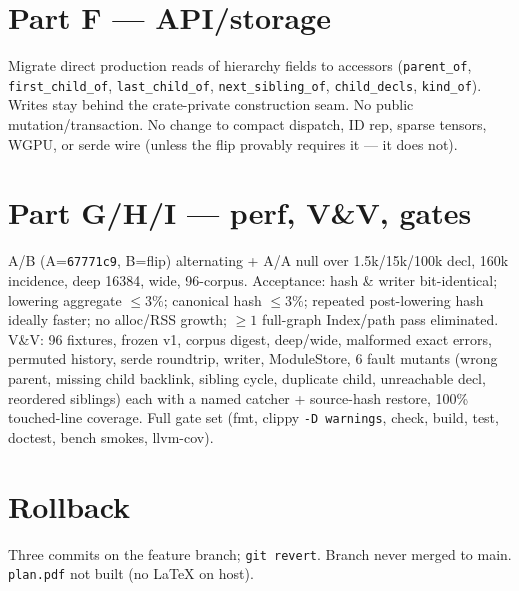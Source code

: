 \documentclass[11pt]{article}
\begin{document}
\section*{Part F --- API/storage}
Migrate direct production reads of hierarchy fields to accessors
(\texttt{parent\_of}, \texttt{first\_child\_of}, \texttt{last\_child\_of},
\texttt{next\_sibling\_of}, \texttt{child\_decls}, \texttt{kind\_of}). Writes stay
behind the crate-private construction seam. No public mutation/transaction. No
change to compact dispatch, ID rep, sparse tensors, WGPU, or serde wire (unless
the flip provably requires it --- it does not).

\section*{Part G/H/I --- perf, V\&V, gates}
A/B (A=\texttt{67771c9}, B=flip) alternating + A/A null over 1.5k/15k/100k decl,
160k incidence, deep 16384, wide, 96-corpus. Acceptance: hash \& writer
bit-identical; lowering aggregate $\leq 3\%$; canonical hash $\leq 3\%$; repeated
post-lowering hash ideally faster; no alloc/RSS growth; $\geq 1$ full-graph
Index/path pass eliminated. V\&V: 96 fixtures, frozen v1, corpus digest,
deep/wide, malformed exact errors, permuted history, serde roundtrip, writer,
ModuleStore, 6 fault mutants (wrong parent, missing child backlink, sibling cycle,
duplicate child, unreachable decl, reordered siblings) each with a named catcher
+ source-hash restore, 100\% touched-line coverage. Full gate set (fmt, clippy
\texttt{-D warnings}, check, build, test, doctest, bench smokes, llvm-cov).

\section*{Rollback}
Three commits on the feature branch; \texttt{git revert}. Branch never merged to
main. \texttt{plan.pdf} not built (no LaTeX on host).
\end{document}
